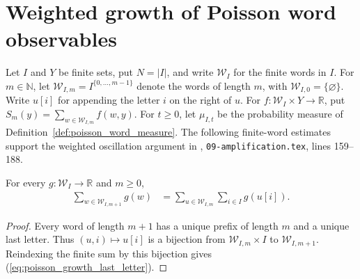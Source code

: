\section{Weighted growth of Poisson word observables}
\label{sec:poisson_word_weighted_growth}

Let $I$ and $Y$ be finite sets, put $N=|I|$, and write
$\mathcal W_I$ for the finite words in $I$.
For $m\in\mathbb N$, let $\mathcal W_{I,m}=I^{\{0,\ldots,m-1\}}$ denote the words of
length $m$, with $\mathcal W_{I,0}=\{\varnothing\}$.
Write $u[i]$ for appending the letter $i$ on the right of $u$.
For $f:\mathcal W_I\times Y\to\mathbb R$, put
$S_m(y)=\sum_{w\in\mathcal W_{I,m}}f(w,y)$.
For $t\geq0$, let $\mu_{I,t}$ be the probability measure of
Definition~\ref{def:poisson_word_measure}.
The following finite-word estimates support the weighted oscillation
argument in \cite{OpenAI2026AreaLaw}, \texttt{09-amplification.tex},
lines 159--188.

\begin{lemma}
\label{lem:poisson_word_sum_length_succ}
\leanok
{}
For every $g:\mathcal W_I\to\mathbb R$ and $m\geq0$,
\begin{align}
 \sum_{w\in\mathcal W_{I,m+1}}g(w)
 &=\sum_{u\in\mathcal W_{I,m}}\sum_{i\in I}g(u[i]).
 \label{eq:poisson_growth_last_letter}
\end{align}
\end{lemma}
\begin{proof}
\leanok
{}
Every word of length $m+1$ has a unique prefix of length $m$ and a
unique last letter.  Thus $(u,i)\mapsto u[i]$ is a bijection from
$\mathcal W_{I,m}\times I$ to $\mathcal W_{I,m+1}$.
Reindexing the finite sum by this bijection gives
(\ref{eq:poisson_growth_last_letter}).
\end{proof}

